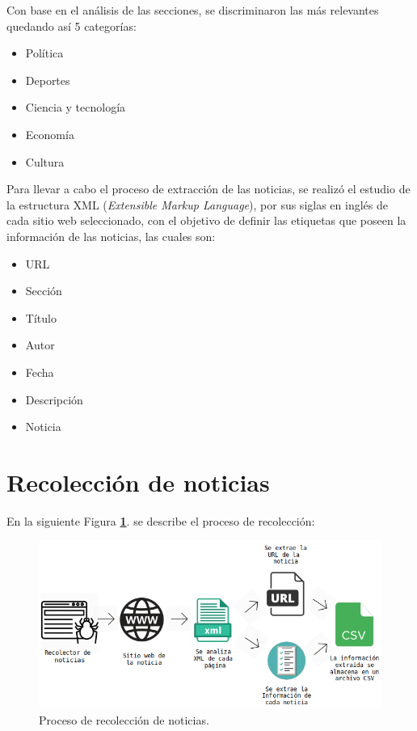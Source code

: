 Con base en el análisis de las secciones, se discriminaron las más relevantes quedando así 5 categorías: 

\begin{itemize}
    \item Política
    \item Deportes
    \item Ciencia y tecnología
    \item Economía
    \item Cultura
\end{itemize}

Para llevar a cabo el proceso de extracción de las noticias, se realizó el estudio 
de la estructura XML (\textit{Extensible Markup Language}), por sus siglas en inglés de cada sitio web seleccionado, con 
el objetivo de definir las etiquetas que poseen la información de las noticias, las cuales son:

\begin{itemize}
  \item URL
  \item Sección
  \item Título
  \item Autor
  \item Fecha
  \item Descripción
  \item Noticia
\end{itemize} 

\section{Recolección de noticias}
En la siguiente Figura \textbf{\ref{fig:diagrama}}. se describe el proceso de recolección:

\begin{figure}[H]
  \centering
  \includegraphics[scale=.50]{imagenes/Capitulo5/diagrama}
  \caption{Proceso de recolección de noticias.}
  \label{fig:diagrama}
\end{figure}

